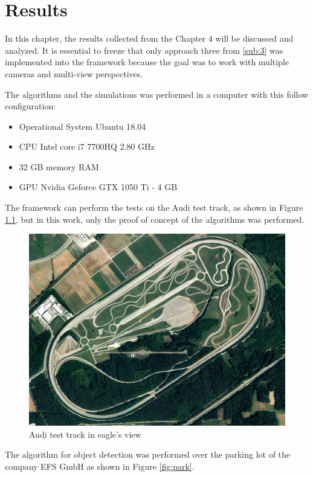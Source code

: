\chapter{Results}
\label{capitulo5}

In this chapter, the results collected from the Chapter 4 will be discussed and analyzed. It is essential to freeze that only approach three from \ref{sub:3} was implemented into the framework because the goal was to work with multiple cameras and multi-view perspectives.

The algorithms and the simulations was performed in a computer with this follow configuration:

\begin{itemize}
    \item Operational System Ubuntu 18.04
    \item CPU Intel core i7 7700HQ 2.80 GHz
    \item 32 GB memory RAM
    \item GPU Nvidia Geforce GTX 1050 Ti - 4 GB
\end{itemize}


The framework can perform the tests on the Audi test track, as shown in Figure \ref{fig:test_track}, but in this work, only the proof of concept of the algorithms was performed. 

\begin{figure}[H]
\centering
\includegraphics[scale=0.3]{imagens/testtrack.jpg}
\caption{Audi test track in eagle's view}
\label{fig:test_track}
\end{figure}


The algorithm for object detection was performed over the parking lot of the company EFS GmbH as shown in Figure \ref{fig:park}.


